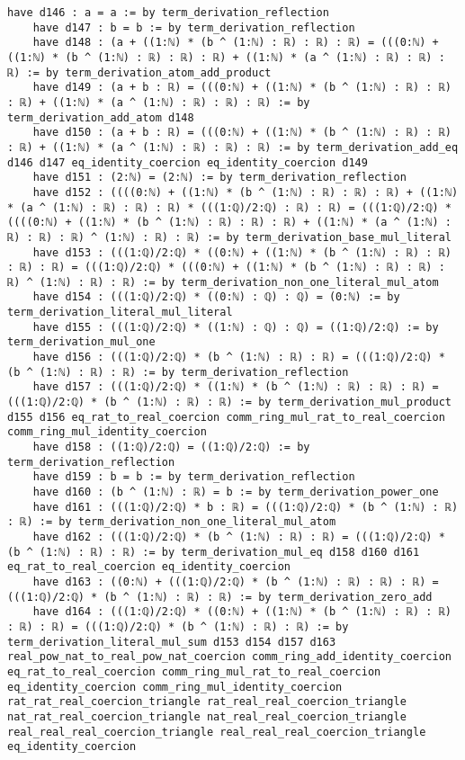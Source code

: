 \documentclass{article}
\begin{document}
\begin{tcolorbox}[colback=white!10, width=\linewidth]
\begin{lstlisting}[language=Lean4]
    have d146 : a = a := by term_derivation_reflection
    have d147 : b = b := by term_derivation_reflection
    have d148 : (a + ((1:ℕ) * (b ^ (1:ℕ) : ℝ) : ℝ) : ℝ) = (((0:ℕ) + ((1:ℕ) * (b ^ (1:ℕ) : ℝ) : ℝ) : ℝ) + ((1:ℕ) * (a ^ (1:ℕ) : ℝ) : ℝ) : ℝ) := by term_derivation_atom_add_product
    have d149 : (a + b : ℝ) = (((0:ℕ) + ((1:ℕ) * (b ^ (1:ℕ) : ℝ) : ℝ) : ℝ) + ((1:ℕ) * (a ^ (1:ℕ) : ℝ) : ℝ) : ℝ) := by term_derivation_add_atom d148
    have d150 : (a + b : ℝ) = (((0:ℕ) + ((1:ℕ) * (b ^ (1:ℕ) : ℝ) : ℝ) : ℝ) + ((1:ℕ) * (a ^ (1:ℕ) : ℝ) : ℝ) : ℝ) := by term_derivation_add_eq d146 d147 eq_identity_coercion eq_identity_coercion d149
    have d151 : (2:ℕ) = (2:ℕ) := by term_derivation_reflection
    have d152 : ((((0:ℕ) + ((1:ℕ) * (b ^ (1:ℕ) : ℝ) : ℝ) : ℝ) + ((1:ℕ) * (a ^ (1:ℕ) : ℝ) : ℝ) : ℝ) * (((1:ℚ)/2:ℚ) : ℝ) : ℝ) = (((1:ℚ)/2:ℚ) * ((((0:ℕ) + ((1:ℕ) * (b ^ (1:ℕ) : ℝ) : ℝ) : ℝ) + ((1:ℕ) * (a ^ (1:ℕ) : ℝ) : ℝ) : ℝ) ^ (1:ℕ) : ℝ) : ℝ) := by term_derivation_base_mul_literal
    have d153 : (((1:ℚ)/2:ℚ) * ((0:ℕ) + ((1:ℕ) * (b ^ (1:ℕ) : ℝ) : ℝ) : ℝ) : ℝ) = (((1:ℚ)/2:ℚ) * (((0:ℕ) + ((1:ℕ) * (b ^ (1:ℕ) : ℝ) : ℝ) : ℝ) ^ (1:ℕ) : ℝ) : ℝ) := by term_derivation_non_one_literal_mul_atom
    have d154 : (((1:ℚ)/2:ℚ) * ((0:ℕ) : ℚ) : ℚ) = (0:ℕ) := by term_derivation_literal_mul_literal
    have d155 : (((1:ℚ)/2:ℚ) * ((1:ℕ) : ℚ) : ℚ) = ((1:ℚ)/2:ℚ) := by term_derivation_mul_one
    have d156 : (((1:ℚ)/2:ℚ) * (b ^ (1:ℕ) : ℝ) : ℝ) = (((1:ℚ)/2:ℚ) * (b ^ (1:ℕ) : ℝ) : ℝ) := by term_derivation_reflection
    have d157 : (((1:ℚ)/2:ℚ) * ((1:ℕ) * (b ^ (1:ℕ) : ℝ) : ℝ) : ℝ) = (((1:ℚ)/2:ℚ) * (b ^ (1:ℕ) : ℝ) : ℝ) := by term_derivation_mul_product d155 d156 eq_rat_to_real_coercion comm_ring_mul_rat_to_real_coercion comm_ring_mul_identity_coercion
    have d158 : ((1:ℚ)/2:ℚ) = ((1:ℚ)/2:ℚ) := by term_derivation_reflection
    have d159 : b = b := by term_derivation_reflection
    have d160 : (b ^ (1:ℕ) : ℝ) = b := by term_derivation_power_one
    have d161 : (((1:ℚ)/2:ℚ) * b : ℝ) = (((1:ℚ)/2:ℚ) * (b ^ (1:ℕ) : ℝ) : ℝ) := by term_derivation_non_one_literal_mul_atom
    have d162 : (((1:ℚ)/2:ℚ) * (b ^ (1:ℕ) : ℝ) : ℝ) = (((1:ℚ)/2:ℚ) * (b ^ (1:ℕ) : ℝ) : ℝ) := by term_derivation_mul_eq d158 d160 d161 eq_rat_to_real_coercion eq_identity_coercion
    have d163 : ((0:ℕ) + (((1:ℚ)/2:ℚ) * (b ^ (1:ℕ) : ℝ) : ℝ) : ℝ) = (((1:ℚ)/2:ℚ) * (b ^ (1:ℕ) : ℝ) : ℝ) := by term_derivation_zero_add
    have d164 : (((1:ℚ)/2:ℚ) * ((0:ℕ) + ((1:ℕ) * (b ^ (1:ℕ) : ℝ) : ℝ) : ℝ) : ℝ) = (((1:ℚ)/2:ℚ) * (b ^ (1:ℕ) : ℝ) : ℝ) := by term_derivation_literal_mul_sum d153 d154 d157 d163 real_pow_nat_to_real_pow_nat_coercion comm_ring_add_identity_coercion eq_rat_to_real_coercion comm_ring_mul_rat_to_real_coercion eq_identity_coercion comm_ring_mul_identity_coercion rat_rat_real_coercion_triangle rat_real_real_coercion_triangle nat_rat_real_coercion_triangle nat_real_real_coercion_triangle real_real_real_coercion_triangle real_real_real_coercion_triangle eq_identity_coercion

\end{lstlisting}
\end{tcolorbox}
\end{document}
